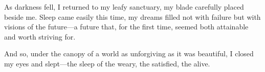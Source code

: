 \documentclass[]{article}
\begin{document}
As darkness fell, I returned to my leafy sanctuary, my blade carefully placed beside me. Sleep came easily this time, my dreams filled not with failure but with visions of the future—a future that, for the first time, seemed both attainable and worth striving for.

And so, under the canopy of a world as unforgiving as it was beautiful, I closed my eyes and slept—the sleep of the weary, the satisfied, the alive.
\end{document}
